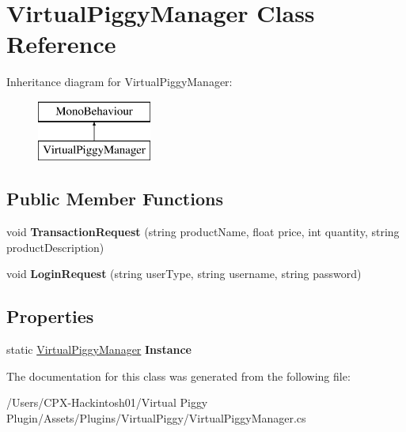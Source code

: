 \hypertarget{class_virtual_piggy_manager}{\section{Virtual\-Piggy\-Manager Class Reference}
\label{class_virtual_piggy_manager}
}
Inheritance diagram for Virtual\-Piggy\-Manager\-:\begin{figure}[H]
\begin{center}
\leavevmode
\includegraphics[height=2.000000cm]{class_virtual_piggy_manager}
\end{center}
\end{figure}
\subsection*{Public Member Functions}
\begin{DoxyCompactItemize}
\item 
\hypertarget{class_virtual_piggy_manager_a192474312edf249e11c66badad6da0a3}{void {\bfseries Transaction\-Request} (string product\-Name, float price, int quantity, string product\-Description)}\label{class_virtual_piggy_manager_a192474312edf249e11c66badad6da0a3}

\item 
\hypertarget{class_virtual_piggy_manager_aa2792d32936ebdc9a002f8dfad7b58b2}{void {\bfseries Login\-Request} (string user\-Type, string username, string password)}\label{class_virtual_piggy_manager_aa2792d32936ebdc9a002f8dfad7b58b2}

\end{DoxyCompactItemize}
\subsection*{Properties}
\begin{DoxyCompactItemize}
\item 
\hypertarget{class_virtual_piggy_manager_a18ed56952c5388270eba62e6357bd7b0}{static \hyperlink{class_virtual_piggy_manager}{Virtual\-Piggy\-Manager} {\bfseries Instance}}\label{class_virtual_piggy_manager_a18ed56952c5388270eba62e6357bd7b0}

\end{DoxyCompactItemize}


The documentation for this class was generated from the following file\-:\begin{DoxyCompactItemize}
\item 
/\-Users/\-C\-P\-X-\/\-Hackintosh01/\-Virtual Piggy Plugin/\-Assets/\-Plugins/\-Virtual\-Piggy/Virtual\-Piggy\-Manager.\-cs\end{DoxyCompactItemize}
